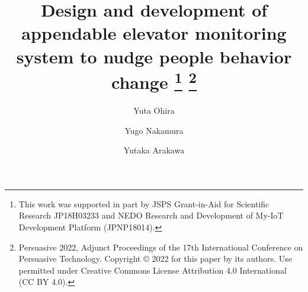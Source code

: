 \documentclass[runningheads]{llncs}
\begin{document}
\title{
  Design and development of appendable elevator monitoring system to nudge people behavior change
  \thanks{This work was supported in part by JSPS Grant-in-Aid for Scientific Research JP18H03233 and NEDO Research and Development of My-IoT Development Platform (JPNP18014).}
  \thanks{Persuasive 2022, Adjunct Proceedings of the 17th International Conference on Persuasive Technology. Copyright © 2022 for this paper by its authors. Use permitted under Creative Commons License Attribution 4.0 International (CC BY 4.0). }
}

\author{
  Yuta Ohira \and
  Yugo Nakamura \and
  Yutaka Arakawa
}



\maketitle








%
%
%

% 
% 

\end{document}
